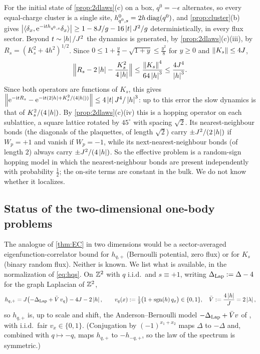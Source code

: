 \begin{remark}\label{rem:checkerstrong}
For the initial state of \cref{prop:2dlaws}(c) on a box, $q^0=-\epsilon$ alternates, so every equal-charge cluster
is a single site, $h^0_{q^0,s}=2h\operatorname{diag}(q^0)$, and \cref{prop:cluster}(b) gives
$\left|\langle\delta_x,\mathrm{e}^{-\mathrm{i} th_{q^0,s}}\delta_x\rangle\right|\ge1-8J/g-16\left|t\right|J^2/g$ deterministically, in every
flux sector.  Beyond $t\sim\left|h\right|/J^2$ the dynamics is generated, by \cref{prop:2dlaws}(c)(iii), by
$R_s=(K_s^2+4h^2)^{1/2}$.  Since $0\le1+\frac y2-\sqrt{1+y}\le\frac{y^2}8$ for $y\ge0$ and $\left\|K_s\right\|\le4J$,
\[
  \Bigl\|R_s-2\left|h\right|-\frac{K_s^2}{4\left|h\right|}\Bigr\|\le\frac{\left\|K_s\right\|^4}{64\left|h\right|^3}\le\frac{4J^4}{\left|h\right|^3} .
\]
Since both operators are functions of $K_s$, this gives
$\left\|\mathrm{e}^{-\mathrm{i} tR_s}-\mathrm{e}^{-\mathrm{i} t(2\left|h\right|+K_s^2/(4\left|h\right|))}\right\|\le4\left|t\right|J^4/\left|h\right|^3$: up to this error the slow dynamics is
that of $K_s^2/(4\left|h\right|)$.  By
\cref{prop:2dlaws}(c)(iv) this is a hopping operator on each sublattice, a square lattice rotated by $45^\circ$
with spacing $\sqrt2$.  Its nearest-neighbour bonds (the diagonals of the plaquettes, of length $\sqrt2$) carry
$\pm J^2/(2\left|h\right|)$ if $W_p=+1$ and vanish if $W_p=-1$, while its next-nearest-neighbour bonds (of length $2$) always
carry $\pm J^2/(4\left|h\right|)$.  So the effective problem is a random-sign hopping model in which the nearest-neighbour
bonds are present independently with probability $\frac12$; the on-site terms are constant in the bulk.  We do not
know whether it localizes.
\end{remark}

\subsection{Status of the two-dimensional one-body problems}\label{sec:2d:status}

The analogue of \cref{thm:EC} in two dimensions would be a sector-averaged eigenfunction-correlator bound for
$h_{q,+}$ (Bernoulli potential, zero flux) or for $K_s$ (binary random flux).  Neither is known.  We list what is
available, in the normalization of \eqref{eq:hqs}.  On $\mathbb{Z}^2$ with $q$ i.i.d.\ and $s\equiv+1$, writing
$\Delta_{\rm Lap}:=\Delta-4$ for the graph Laplacian of $\mathbb{Z}^2$,
\begin{equation}\label{eq:2dnormalization}
  h_{q,+}=J\bigl(-\Delta_{\rm Lap}+\bar V\,v_q\bigr)-4J-2\left|h\right|,\qquad v_q(x):=\tfrac12\bigl(1+\operatorname{sgn}(h)\,q_x\bigr)\in\{0,1\},\quad
  \bar V:=\frac{4\left|h\right|}J=2\left|\lambda\right| ,
\end{equation}
so $h_{q,+}$ is, up to scale and shift, the Anderson--Bernoulli model $-\Delta_{\rm Lap}+\bar Vv$ of
\cite{DingSmart2020,LiL2022}, with i.i.d.\ fair $v_x\in\{0,1\}$.  (Conjugation by $(-1)^{x_1+x_2}$ maps $\Delta$ to
$-\Delta$ and, combined with $q\mapsto-q$, maps $h_{q,+}$ to $-h_{-q,+}$, so the law of the spectrum is symmetric.)

